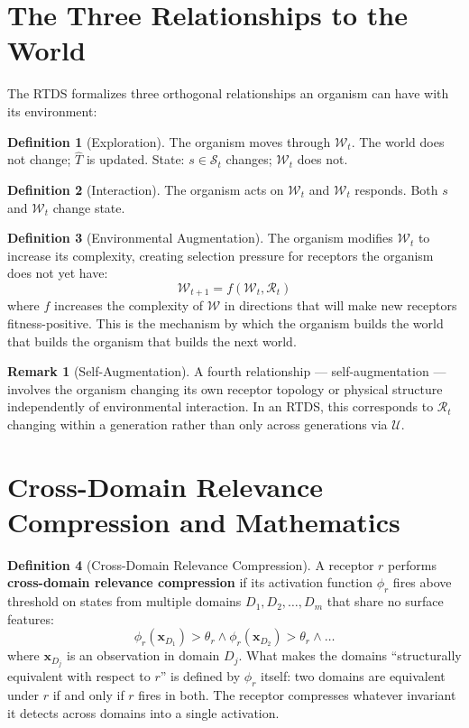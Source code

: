 \documentclass[12pt]{article}
\theoremstyle{definition}
\newtheorem{definition}{Definition}
\newtheorem{remark}{Remark}
\begin{document}
\section{The Three Relationships to the World}

The RTDS formalizes three orthogonal relationships an organism can have with its environment:

\begin{definition}[Exploration]
The organism moves through $\mathcal{W}_t$. The world does not change; $\hat{T}$ is
updated. State: $s \in \mathcal{S}_t$ changes; $\mathcal{W}_t$ does not.
\end{definition}

\begin{definition}[Interaction]
The organism acts on $\mathcal{W}_t$ and $\mathcal{W}_t$ responds. Both $s$ and
$\mathcal{W}_t$ change state.
\end{definition}

\begin{definition}[Environmental Augmentation]
The organism modifies $\mathcal{W}_t$ to increase its complexity, creating selection
pressure for receptors the organism does not yet have:
\[
\mathcal{W}_{t+1} = f(\mathcal{W}_t, \mathcal{R}_t)
\]
where $f$ increases the complexity of $\mathcal{W}$ in directions that will make new
receptors fitness-positive. This is the mechanism by which the organism builds the world
that builds the organism that builds the next world.
\end{definition}

\begin{remark}[Self-Augmentation]
A fourth relationship --- self-augmentation --- involves the organism changing its own
receptor topology or physical structure independently of environmental interaction.
In an RTDS, this corresponds to $\mathcal{R}_t$ changing within a generation rather than
only across generations via $\mathcal{U}$.
\end{remark}

\section{Cross-Domain Relevance Compression and Mathematics}

\begin{definition}[Cross-Domain Relevance Compression]
A receptor $r$ performs \textbf{cross-domain relevance compression} if its activation
function $\phi_r$ fires above threshold on states from multiple domains
$D_1, D_2, \ldots, D_m$ that share no surface features:
\[
\phi_r(\mathbf{x}_{D_1}) > \theta_r \wedge \phi_r(\mathbf{x}_{D_2}) > \theta_r \wedge \ldots
\]
where $\mathbf{x}_{D_j}$ is an observation in domain $D_j$. What makes the domains
``structurally equivalent with respect to $r$'' is defined by $\phi_r$ itself: two
domains are equivalent under $r$ if and only if $r$ fires in both. The receptor
compresses whatever invariant it detects across domains into a single activation.
\end{definition}
\end{document}
